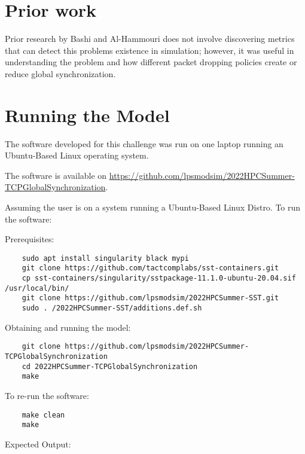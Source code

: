 \documentclass{article}
\begin{document}
\section{Prior work} %
Prior research by Bashi and Al-Hammouri \cite{Bashi2017} does not involve discovering metrics that can detect this problems existence in simulation; however, it was useful in understanding the problem and how different packet dropping policies create or reduce global synchronization.

\section{Running the Model}

The software developed for this challenge was run on one laptop running an Ubuntu-Based Linux operating system.

\noindent The software is available on \href{https://github.com/lpsmodsim/2022HPCSummer-TCPGlobalSynchronization}{https://github.com/lpsmodsim/2022HPCSummer-TCPGlobalSynchronization}.\newline

\noindent Assuming the user is on a system running a Ubuntu-Based Linux Distro. To run the software:\newline

\noindent Prerequisites: 

\begin{verbatim}
	sudo apt install singularity black mypi
	git clone https://github.com/tactcomplabs/sst-containers.git
	cp sst-containers/singularity/sstpackage-11.1.0-ubuntu-20.04.sif /usr/local/bin/
	git clone https://github.com/lpsmodsim/2022HPCSummer-SST.git
	sudo . /2022HPCSummer-SST/additions.def.sh
\end{verbatim}

\noindent Obtaining and running the model:

\begin{verbatim}
	git clone https://github.com/lpsmodsim/2022HPCSummer-TCPGlobalSynchronization
	cd 2022HPCSummer-TCPGlobalSynchronization
	make
\end{verbatim}

\noindent To re-run the software:

\begin{verbatim}
	make clean
	make
\end{verbatim}

\noindent Expected Output:
\end{document}
